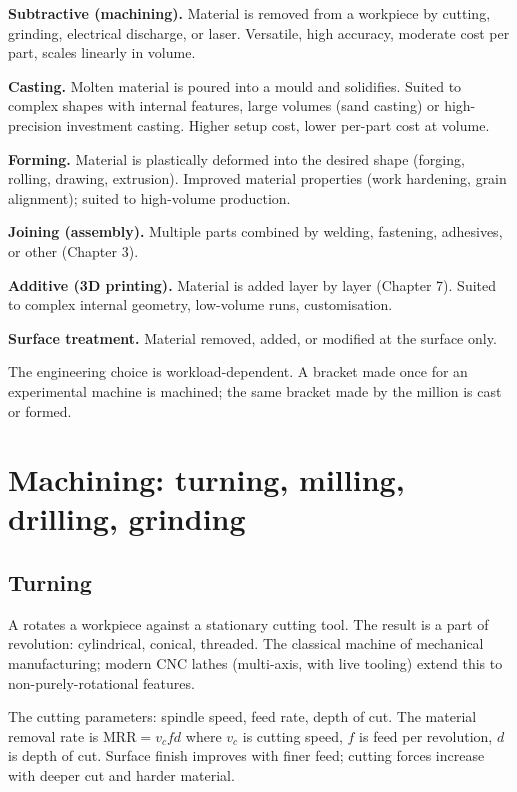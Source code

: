 \textbf{Subtractive (machining).} Material is removed from a workpiece by cutting, grinding, electrical discharge, or laser. Versatile, high accuracy, moderate cost per part, scales linearly in volume.

\textbf{Casting.} Molten material is poured into a mould and solidifies. Suited to complex shapes with internal features, large volumes (sand casting) or high-precision investment casting. Higher setup cost, lower per-part cost at volume.

\textbf{Forming.} Material is plastically deformed into the desired shape (forging, rolling, drawing, extrusion). Improved material properties (work hardening, grain alignment); suited to high-volume production.

\textbf{Joining (assembly).} Multiple parts combined by welding, fastening, adhesives, or other (Chapter 3).

\textbf{Additive (3D printing).} Material is added layer by layer (Chapter 7). Suited to complex internal geometry, low-volume runs, customisation.

\textbf{Surface treatment.} Material removed, added, or modified at the surface only.

The engineering choice is workload-dependent. A bracket made once for an experimental machine is machined; the same bracket made by the million is cast or formed.

\section{Machining: turning, milling, drilling, grinding}

\subsection{Turning}

A  rotates a workpiece against a stationary cutting tool. The result is a part of revolution: cylindrical, conical, threaded. The classical machine of mechanical manufacturing; modern CNC lathes (multi-axis, with live tooling) extend this to non-purely-rotational features.

The cutting parameters: spindle speed, feed rate, depth of cut. The material removal rate is $\text{MRR} = v_c f d$ where $v_c$ is cutting speed, $f$ is feed per revolution, $d$ is depth of cut. Surface finish improves with finer feed; cutting forces increase with deeper cut and harder material.

